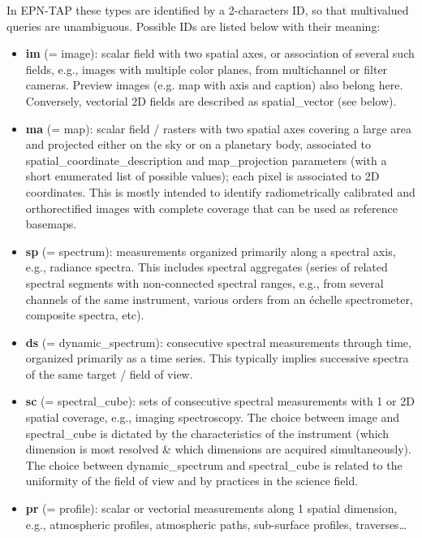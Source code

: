 \documentclass[11pt,a4paper]{ivoa}
\begin{document}
In EPN-TAP these types are identified by a 2-characters ID, so that multivalued queries are unambiguous. Possible IDs are listed below with their meaning:

\begin{itemize}

\item \textbf{im }(= image): scalar field with two spatial axes, or association of several such fields, e.g., images with multiple color planes, from multichannel or filter cameras. Preview images (e.g. map with axis and caption) also belong here. Conversely, vectorial 2D fields are described as spatial\_vector (see below).

\item \textbf{ma }(= map): scalar field / rasters with two spatial axes covering a large area and projected either on the sky or on a planetary body, associated to spatial\_coordinate\_description and map\_projection parameters (with a short enumerated list of possible values); each pixel is associated to 2D coordinates. This is mostly intended to identify radiometrically calibrated and orthorectified images with complete coverage that can be used as reference basemaps. 

\item \textbf{sp }(= spectrum): measurements organized primarily along a spectral axis, e.g., radiance spectra. This includes spectral aggregates (series of related spectral segments with non-connected spectral ranges, e.g., from several channels of the same instrument, various orders from an échelle spectrometer, composite spectra, etc).

\item \textbf{ds }(= dynamic\_spectrum): consecutive spectral measurements through time, organized primarily as a time series. This typically implies successive spectra of the same target / field of view.

\item \textbf{sc }(= spectral\_cube): sets of consecutive spectral measurements with 1 or 2D spatial coverage, e.g., imaging spectroscopy. The choice between image and spectral\_cube is dictated by the characteristics of the instrument (which dimension is most resolved \& which dimensions are acquired simultaneously). The choice between dynamic\_spectrum and spectral\_cube is related to the uniformity of the field of view and by practices in the science field.

\item \textbf{pr }(= profile): scalar or vectorial measurements along 1 spatial dimension, e.g., atmospheric profiles, atmospheric paths, sub-surface profiles, traverses…


\end{itemize}
\end{document}
